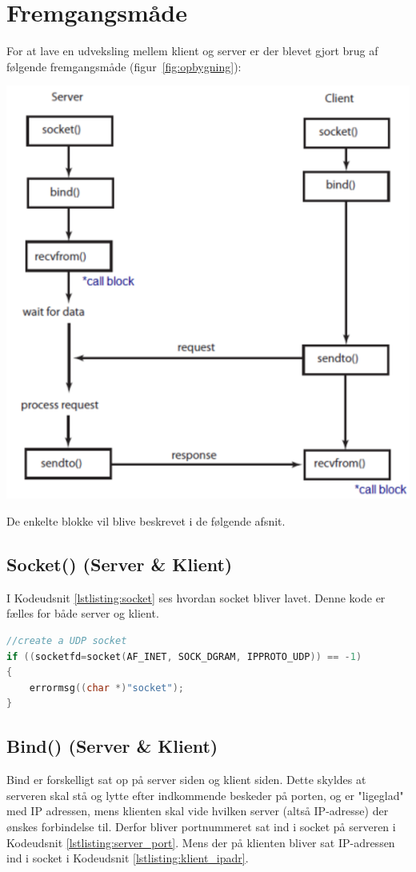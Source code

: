\documentclass[12pt,fleqn,a4paper]{report}
\begin{document}
\chapter{Fremgangsmåde}
For at lave en udveksling mellem klient og server er der blevet gjort brug af følgende fremgangsmåde (figur~\ref{fig:opbygning}):
\begin{center}
	\includegraphics[width=0.7 \textwidth]{opbygning.png}
	\label{fig:opbygning}
\end{center}

De enkelte blokke vil blive beskrevet i de følgende afsnit.

\newpage

\section{Socket() (Server \& Klient)}
I Kodeudsnit \ref{lstlisting:socket} ses hvordan socket bliver lavet. Denne kode er fælles for både server og klient.

\begin{framed}
	\begin{lstlisting}[language=C++]
//create a UDP socket
if ((socketfd=socket(AF_INET, SOCK_DGRAM, IPPROTO_UDP)) == -1)
{
	errormsg((char *)"socket");
}
\end{lstlisting}
\end{framed}
\label{lstlisting:socket}
\vspace{5mm} %

\section{Bind() (Server \& Klient)}
Bind er forskelligt sat op på server siden og klient siden. Dette skyldes at serveren skal stå og lytte efter indkommende beskeder på porten, og er "ligeglad" med IP adressen, mens klienten skal vide hvilken server (altså IP-adresse) der ønskes forbindelse til. Derfor bliver portnummeret sat ind i socket på serveren i Kodeudsnit \ref{lstlisting:server_port}.
Mens der på klienten bliver sat IP-adressen ind i socket i Kodeudsnit \ref{lstlisting:klient_ipadr}.
\end{document}

